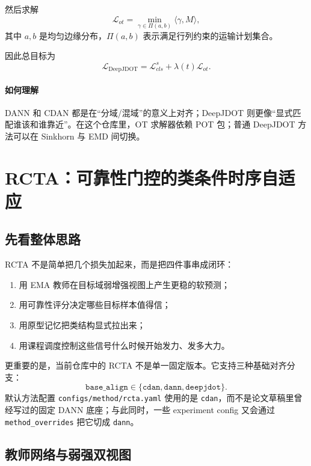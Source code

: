 \documentclass[12pt,a4paper]{ctexart}
\begin{document}
然后求解
\begin{equation}
\mathcal{L}_{ot}
=
\min_{\gamma\in \Pi(a,b)} \langle \gamma, M\rangle,
\end{equation}
其中 $a,b$ 是均匀边缘分布，$\Pi(a,b)$ 表示满足行列约束的运输计划集合。

因此总目标为
\begin{equation}
\mathcal{L}_{\mathrm{DeepJDOT}}
=
\mathcal{L}_{cls}^s+\lambda(t)\mathcal{L}_{ot}.
\end{equation}

\paragraph{如何理解} DANN 和 CDAN 都是在“分域/混域”的意义上对齐；DeepJDOT 则更像“显式匹配谁该和谁靠近”。在这个仓库里，OT 求解器依赖 POT 包；普通 DeepJDOT 方法可以在 Sinkhorn 与 EMD 间切换。

\section{RCTA：可靠性门控的类条件时序自适应}

\subsection{先看整体思路}

RCTA 不是简单把几个损失加起来，而是把四件事串成闭环：
\begin{enumerate}[leftmargin=2em]
  \item 用 EMA 教师在目标域弱增强视图上产生更稳的软预测；
  \item 用可靠性评分决定哪些目标样本值得信；
  \item 用原型记忆把类结构显式拉出来；
  \item 用课程调度控制这些信号什么时候开始发力、发多大力。
\end{enumerate}

更重要的是，当前仓库中的 RCTA 不是单一固定版本。它支持三种基础对齐分支：
\begin{equation}
\texttt{base\_align}\in\{\texttt{cdan},\texttt{dann},\texttt{deepjdot}\}.
\end{equation}
默认方法配置 \texttt{configs/method/rcta.yaml} 使用的是 \texttt{cdan}，而不是论文草稿里曾经写过的固定 DANN 底座；与此同时，一些 experiment config 又会通过 \texttt{method\_overrides} 把它切成 \texttt{dann}。

\subsection{教师网络与弱强双视图}
\end{document}
